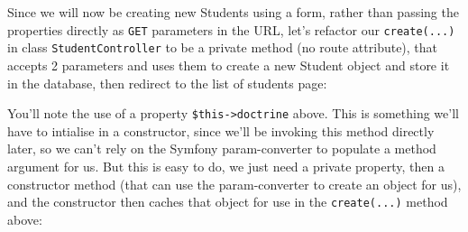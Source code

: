 \documentclass[a4paperpaper,openright]{book}
\newenvironment{Shaded}{}{}
\newcommand{\FunctionTok}[1]{\textcolor[rgb]{0.02,0.16,0.49}{#1}}
\newcommand{\KeywordTok}[1]{\textcolor[rgb]{0.00,0.44,0.13}{\textbf{#1}}}
\newcommand{\NormalTok}[1]{#1}
\newcommand{\OtherTok}[1]{\textcolor[rgb]{0.00,0.44,0.13}{#1}}
\newcommand{\StringTok}[1]{\textcolor[rgb]{0.25,0.44,0.63}{#1}}
\begin{document}
Since we will now be creating new Students using a form, rather than
passing the properties directly as \texttt{GET} parameters in the URL,
let's refactor our \texttt{create(...)} in class
\texttt{StudentController} to be a private method (no route attribute),
that accepts 2 parameters and uses them to create a new Student object
and store it in the database, then redirect to the list of students
page:

\begin{Shaded}
\end{Shaded}

You'll note the use of a property \texttt{\$this-\textgreater{}doctrine}
above. This is something we'll have to intialise in a constructor, since
we'll be invoking this method directly later, so we can't rely on the
Symfony param-converter to populate a method argument for us. But this
is easy to do, we just need a private property, then a constructor
method (that can use the param-converter to create an object for us),
and the constructor then caches that object for use in the
\texttt{create(...)} method above:

\begin{Shaded}
\end{Shaded}
\end{document}
